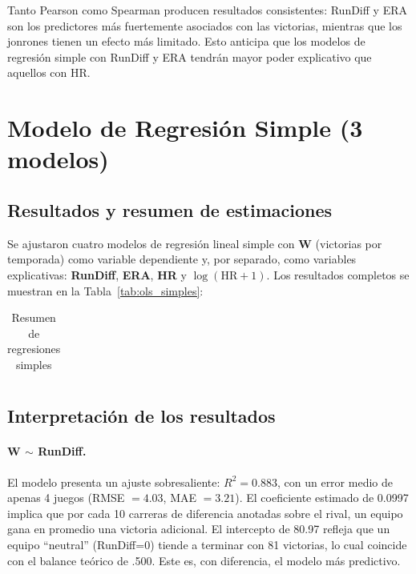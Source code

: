 \documentclass[10pt]{article}
\begin{document}
Tanto Pearson como Spearman producen resultados consistentes: RunDiff y ERA son los predictores más fuertemente asociados con las victorias, mientras que los jonrones tienen un efecto más limitado. Esto anticipa que los modelos de regresión simple con RunDiff y ERA tendrán mayor poder explicativo que aquellos con HR.
\section{Modelo de Regresión Simple (3 modelos)}

\subsection{Resultados y resumen de estimaciones}

Se ajustaron cuatro modelos de regresión lineal simple con \textbf{W} (victorias por temporada) 
como variable dependiente y, por separado, como variables explicativas: \textbf{RunDiff}, \textbf{ERA}, \textbf{HR} y \textbf{\(\log(\text{HR}+1)\)}. Los resultados completos se muestran en la Tabla~\ref{tab:ols_simples}:

\begin{table}[H]
    \centering
    \begin{tabularx}{\textwidth}{l *{14}{X}}
    
    \end{tabularx}
    \caption{Resumen de regresiones simples}
    \label{tab:ols_summary}
\end{table}

\subsection{Interpretación de los resultados}

\paragraph{W \(\sim\) RunDiff.}  
El modelo presenta un ajuste sobresaliente: \(R^2=0.883\), con un error medio de apenas 4 juegos (RMSE \(=4.03\), MAE \(=3.21\)). El coeficiente estimado de 0.0997 implica que por cada 10 carreras de diferencia anotadas sobre el rival, un equipo gana en promedio una victoria adicional. El intercepto de 80.97 refleja que un equipo “neutral” (RunDiff=0) tiende a terminar con 81 victorias, lo cual coincide con el balance teórico de .500. Este es, con diferencia, el modelo más predictivo.
\end{document}
